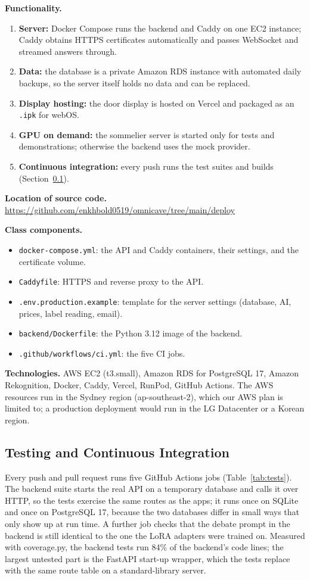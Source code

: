 \documentclass[conference]{IEEEtran}
\begin{document}
\textbf{Functionality.}
\begin{enumerate}
    \item \textbf{Server:} Docker Compose runs the backend and Caddy on one EC2 instance; Caddy obtains HTTPS certificates automatically and passes WebSocket and streamed answers through.
    \item \textbf{Data:} the database is a private Amazon RDS instance with automated daily backups, so the server itself holds no data and can be replaced.
    \item \textbf{Display hosting:} the door display is hosted on Vercel and packaged as an \texttt{.ipk} for webOS.
    \item \textbf{GPU on demand:} the sommelier server is started only for tests and demonstrations; otherwise the backend uses the mock provider.
    \item \textbf{Continuous integration:} every push runs the test suites and builds (Section~\ref{sec:testing}).
\end{enumerate}

\textbf{Location of source code.} \url{https://github.com/enkhbold0519/omnicave/tree/main/deploy}

\textbf{Class components.}
\begin{itemize}
    \item \texttt{docker-compose.yml}: the API and Caddy containers, their settings, and the certificate volume.
    \item \texttt{Caddyfile}: HTTPS and reverse proxy to the API.
    \item \texttt{.env.production.example}: template for the server settings (database, AI, prices, label reading, email).
    \item \texttt{backend/Dockerfile}: the Python 3.12 image of the backend.
    \item \texttt{.github/workflows/ci.yml}: the five CI jobs.
\end{itemize}

\textbf{Technologies.} AWS EC2 (t3.small), Amazon RDS for PostgreSQL 17, Amazon Rekognition, Docker, Caddy, Vercel, RunPod, GitHub Actions. The AWS resources run in the Sydney region (ap-southeast-2), which our AWS plan is limited to; a production deployment would run in the LG Datacenter or a Korean region.

\subsection{Testing and Continuous Integration}\label{sec:testing}
Every push and pull request runs five GitHub Actions jobs (Table~\ref{tab:tests}). The backend suite starts the real API on a temporary database and calls it over HTTP, so the tests exercise the same routes as the apps; it runs once on SQLite and once on PostgreSQL 17, because the two databases differ in small ways that only show up at run time. A further job checks that the debate prompt in the backend is still identical to the one the LoRA adapters were trained on. Measured with coverage.py, the backend tests run 84\% of the backend's code lines; the largest untested part is the FastAPI start-up wrapper, which the tests replace with the same route table on a standard-library server.
\end{document}
